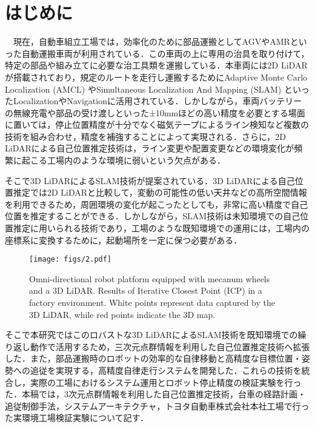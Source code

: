 \section{はじめに}

　現在，自動車組立工場では，効率化のために部品運搬としてAGVやAMRといった自動運搬車両が利用されている．この車両の上に専用の治具を取り付けて，特定の部品や組み立てに必要な治工具類を運搬している．本車両には2D LiDARが搭載されており，規定のルートを走行し運搬するためにAdaptive Monte Carlo Localization (AMCL) やSimultaneous Localization And Mapping (SLAM)\cite{2d-AMCL, 2d-SLAM} といったLocalizationやNavigationに活用されている．しかしながら，車両バッテリーの無線充電や部品の受け渡しといった±10mmほどの高い精度を必要とする場面に置いては，停止位置精度が十分でなく磁気テープによるライン検知など複数の技術を組み合わせ，精度を補強することによって実現される．さらに，2D LiDARによる自己位置推定技術は，ライン変更や配置変更などの環境変化が頻繁に起こる工場内のような環境に弱いという欠点がある．

そこで3D LiDARによるSLAM技術が提案されている\cite{6DSLAM_outside, 3D_SLAM_outside, EKF_SLAM, FAST-LIO, FAST-LIO2}．3D LiDARによる自己位置推定では2D LiDARと比較して，変動の可能性の低い天井などの高所空間情報を利用できるため，周囲環境の変化が起こったとしても，非常に高い精度で自己位置を推定することができる．しかしながら，SLAM技術は未知環境での自己位置推定に用いられる技術であり，工場のような既知環境での運用には，工場内の座標系に変換するために，起動場所を一定に保つ必要がある．

\begin{figure}[!t]
  \texttt{[image: figs/2.pdf]}
  \caption{Omni-directional robot platform equipped with mecanum wheels and a 3D LiDAR. Results of Iterative Closest Point (ICP) in a factory environment. White points represent data captured by the 3D LiDAR, while red points indicate the 3D map.}
\label{fig:fig2}

\end{figure}

そこで本研究ではこのロバストな3D LiDARによるSLAM技術を既知環境での繰り返し動作で活用するため，三次元点群情報を利用した自己位置推定技術へ拡張した．また，部品運搬時のロボットの効率的な自律移動と高精度な目標位置・姿勢への追従を実現する，高精度自律走行システムを開発した．これらの技術を統合し，実際の工場におけるシステム運用とロボット停止精度の検証実験を行った．本稿では，3次元点群情報を利用した自己位置推定技術，台車の経路計画・追従制御手法，システムアーキテクチャ，トヨタ自動車株式会社本社工場で行った実環境工場検証実験について記す．
